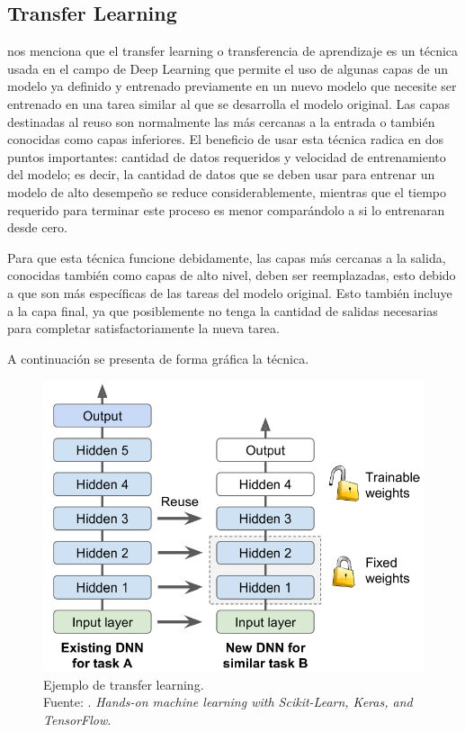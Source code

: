 \subsection{Transfer Learning}
\cite{bk_geron2022handml} nos menciona que el transfer learning o transferencia de aprendizaje es un técnica usada en el campo de Deep Learning que permite el uso de algunas capas de un modelo ya definido y entrenado previamente en un nuevo modelo que necesite ser entrenado en una tarea similar al que se desarrolla el modelo original. Las capas destinadas al reuso son normalmente las más cercanas a la entrada o también conocidas como capas inferiores. El beneficio de usar esta técnica radica en dos puntos importantes: cantidad de datos requeridos y velocidad de entrenamiento del modelo; es decir, la cantidad de datos que se deben usar para entrenar un modelo de alto desempeño se reduce considerablemente, mientras que el tiempo requerido para terminar este proceso es menor comparándolo a si lo entrenaran desde cero.

Para que esta técnica funcione debidamente, las capas más cercanas a la salida, conocidas también como capas de alto nivel, deben ser reemplazadas, esto debido a que son más específicas de las tareas del modelo original. Esto también incluye a la capa final, ya que posiblemente no tenga la cantidad de salidas necesarias para completar satisfactoriamente la nueva tarea.

A continuación se presenta de forma gráfica la técnica.

\begin{figure}[H]
	\begin{center}
		\includegraphics[width=1.00\textwidth]{2/figures/transfer_learning.PNG}
		\caption[Ejemplo de transfer learning]{Ejemplo de transfer learning. \\
		Fuente: \cite{bk_geron2022handml}. \textit{Hands-on machine learning with Scikit-Learn, Keras, and TensorFlow}.}
		\label{2:fig210}
	\end{center}
\end{figure}



